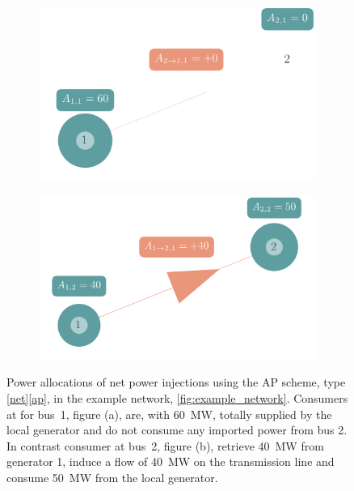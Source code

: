 \documentclass[11pt,twocolumn]{article}
\begin{document}
\begin{figure}[h!]
    \begin{subfigure}[c]{.495\linewidth}
    \includegraphics[width=\linewidth]{example_allocation_bus1_net_ebe.png}
    \vspace{-40pt}
    \subcaption{}
    \label{fig:example_allocation_bus1}
    \end{subfigure}
    \begin{subfigure}[c]{.495\linewidth}
    \includegraphics[width=\linewidth]{example_allocation_bus2_net_ebe.png}
    \vspace{-40pt}
    \subcaption{}
    \label{fig:example_allocation_bus2}
    \end{subfigure}
    \caption{Power allocations of net power injections using the AP scheme, type \ref{net}\ref{ap}, in the example network, \cref{fig:example_network}. Consumers at for bus~1, figure (a), are, with 60~MW, totally supplied by the local generator and do not consume any imported power from bus 2. In contrast consumer at bus~2, figure (b), retrieve 40~MW from generator 1, induce a flow of 40~MW on the transmission line and consume 50~MW from the local generator.}
    \label{fig:example_allocation}
\end{figure}
\end{document}
